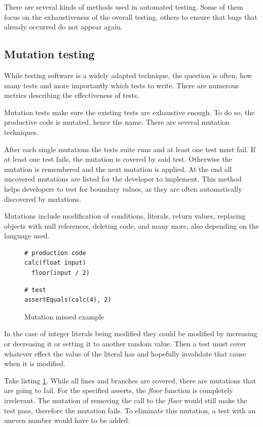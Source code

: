There are several kinds of methods used in automated testing. Some of them
focus on the exhaustiveness of the overall testing, others to ensure that bugs
that already occurred do not appear again.

\subsection{Mutation testing}

While testing software is a widely adapted technique, the question is often,
how many tests and more importantly which tests to write. There are numerous
metrics describing the effectiveness of tests.

Mutation tests make sure the existing tests are exhaustive enough. To do so,
the productive code is mutated, hence the name. There are several mutation
techniques.

After each single mutations the tests suite runs and at least one test must
fail. If at least one test fails, the mutation is covered by said test.
Otherwise the mutation is remembered and the next mutation is applied. At the
end all uncovered mutations are listed for the developer to implement. This
method helps developers to test for boundary values, as they are often
automatically discovered by mutations.

Mutations include modification of conditions, literals, return values,
replacing objects with null references, deleting code, and many more, also
depending on the language used.

\begin{figure}
\begin{lstlisting}
# production code
calc(float input)
  floor(input / 2)
\end{lstlisting}
\begin{lstlisting}
# test
assertEquals(calc(4), 2)
\end{lstlisting}
\caption{Mutation missed example}
\label{code:bad_mutation}
\end{figure}

In the case of integer literals being modified they could be modified by
increasing or decreasing it or setting it to another random value. Then a test
must cover whatever effect the value of the literal has and hopefully
invalidate that cause when it is modified.

Take listing \ref{code:bad_mutation}. While all lines and branches are covered,
there are mutations that are going to fail. For the specified asserts, the
\textit{floor} function is completely irrelevant. The mutation of removing the
call to the \textit{floor} would still make the test pass, therefore the
mutation fails. To eliminate this mutation, a test with an uneven number would
have to be added.

